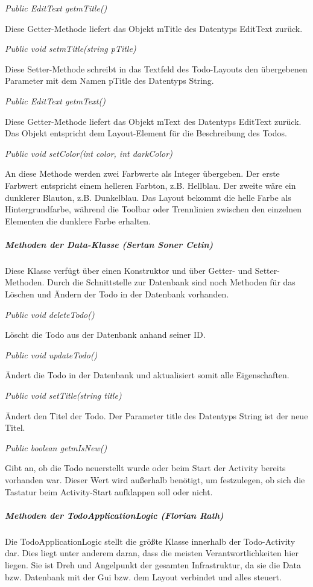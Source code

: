 \textit{Public EditText getmTitle()}

	Diese Getter-Methode liefert das Objekt mTitle des Datentyps EditText zurück.

\textit{Public void setmTitle(string pTitle)}

Diese Setter-Methode schreibt in das Textfeld des Todo-Layouts den übergebenen Parameter mit dem Namen pTitle des Datentyps String.

\textit{Public EditText getmText()}

Diese Getter-Methode liefert das Objekt mText des Datentyps EditText zurück. Das Objekt entspricht dem Layout-Element für die Beschreibung des Todos.

\textit{Public void setColor(int color, int darkColor)}

An diese Methode werden zwei Farbwerte als Integer übergeben. Der erste Farbwert entspricht einem helleren Farbton, z.B. Hellblau. Der zweite wäre ein dunklerer Blauton, z.B. Dunkelblau. Das Layout bekommt die helle Farbe als Hintergrundfarbe, während die Toolbar oder Trennlinien zwischen den einzelnen Elementen die dunklere Farbe erhalten.

\subparagraph{Methoden der Data-Klasse (Sertan Soner Cetin)}

Diese Klasse verfügt über einen Konstruktor und über Getter- und Setter-Methoden. Durch die Schnittstelle zur Datenbank sind noch Methoden für das Löschen und Ändern der Todo in der Datenbank vorhanden.

\textit{Public void deleteTodo()}

	Löscht die Todo aus der Datenbank anhand seiner ID.

\textit{Public void updateTodo()}

	Ändert die Todo in der Datenbank und aktualisiert somit alle Eigenschaften.

\textit{Public void setTitle(string title)}

Ändert den Titel der Todo. Der Parameter title des Datentyps String ist der neue Titel.

\textit{Public boolean getmIsNew()}

Gibt an, ob die Todo neuerstellt wurde oder beim Start der Activity bereits vorhanden war. Dieser Wert wird außerhalb benötigt, um festzulegen, ob sich die Tastatur beim Activity-Start aufklappen soll oder nicht.

\subparagraph{Methoden der TodoApplicationLogic (Florian Rath)}

Die TodoApplicationLogic stellt die größte Klasse innerhalb der Todo-Activity dar. Dies liegt unter anderem daran, dass die meisten Verantwortlichkeiten hier liegen. Sie ist Dreh und Angelpunkt der gesamten Infrastruktur, da sie die Data bzw. Datenbank mit der Gui bzw. dem Layout verbindet und alles steuert.

